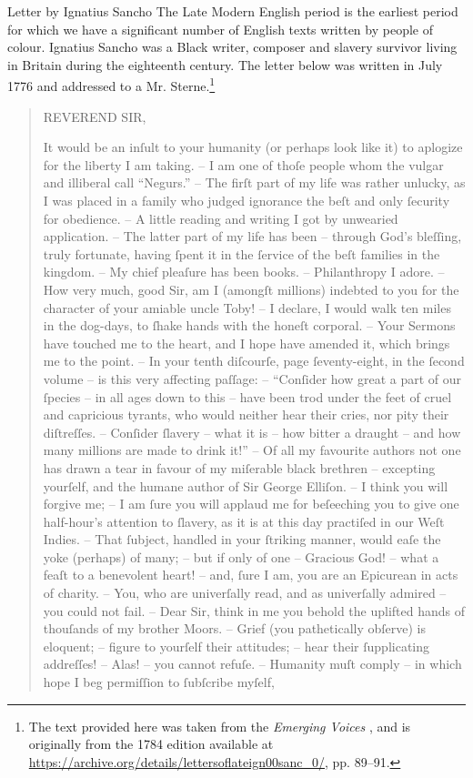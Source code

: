 \begin{texts}{Letter by Ignatius Sancho}
The Late Modern English period is the earliest period for which we have a significant number of English texts written by people of colour. Ignatius Sancho was a Black writer, composer and slavery survivor living in Britain during the eighteenth century. The letter below was written in July 1776 and addressed to a Mr. Sterne.\footnote{The text provided here was taken from the \emph{Emerging Voices}  \citep{Walkden2019}, and is originally from the 1784 edition available at \url{https://archive.org/details/lettersoflateign00sanc_0/}, pp. 89--91.}

\begin{quote}
    \internallinenumbers*{}
    REVEREND SIR,

    It would be an inſult to your humanity (or perhaps look like it) to aplogize for the liberty I am taking. -- I am one of thoſe people whom the vulgar and illiberal call ``Negurs.'' -- The firſt part of my life was rather unlucky, as I was placed in a family who judged ignorance the beſt and only ſecurity for obedience. -- A little reading and writing I got by unwearied application. -- The latter part of my life has been -- through God's bleſſing, truly fortunate, having ſpent it in the ſervice of the beſt families in the kingdom. -- My chief pleaſure has been books. -- Philanthropy I adore. -- How very much, good Sir, am I (amongſt millions) indebted to you for the character of your amiable uncle Toby! -- I declare, I would walk ten miles in the dog-days, to ſhake hands with the honeſt corporal. -- Your Sermons have touched me to the heart, and I hope have amended it, which brings me to the point. -- In your tenth diſcourſe, page ſeventy-eight, in the ſecond volume -- is this very affecting paſſage: -- ``Conſider how great a part of our ſpecies -- in all ages down to this -- have been trod under the feet of cruel and capricious tyrants, who would neither hear their cries, nor pity their diſtreſſes. -- Conſider ſlavery -- what it is -- how bitter a draught -- and how many millions are made to drink it!'' -- Of all my favourite authors not one has drawn a tear in favour of my miſerable black brethren -- excepting yourſelf, and the humane author of Sir George Elliſon. -- I think you will forgive me; -- I am ſure you will applaud me for beſeeching you to give one half-hour's attention to ſlavery, as it is at this day practiſed in our Weſt Indies. -- That ſubject, handled in your ſtriking manner, would eaſe the yoke (perhaps) of many; -- but if only of one -- Gracious God! -- what a feaſt to a benevolent heart! -- and, ſure I am, you are an Epicurean in acts of charity. -- You, who are univerſally read, and as univerſally admired -- you could not fail. -- Dear Sir, think in me you behold the uplifted hands of thouſands of my brother Moors. -- Grief (you pathetically obſerve) is eloquent; -- figure to yourſelf their attitudes; -- hear their ſupplicating addreſſes! -- Alas! -- you cannot refuſe. -- Humanity muſt comply -- in which hope I beg permiſſion to ſubſcribe myſelf,


\end{quote}
\end{texts}
